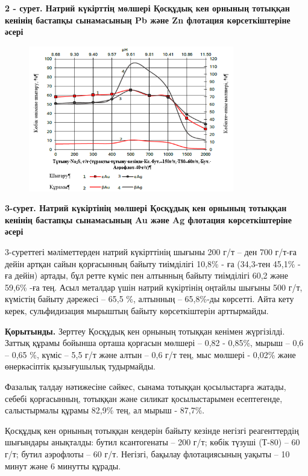 {{\bfseries 2 - сурет. Натрий күкірттің мөлшері Қосқұдық кен орнының
тотыққан кенінің бастапқы сынамасының Pb және Zn флотация
көрсеткіштеріне әсері}

\begin{figure}[H]
	\centering
	\includegraphics[width=0.8\textwidth]{media/gorn/image8}
	\caption*{}
\end{figure}


{\bfseries 3-сурет. Натрий күкіртінің мөлшері Қосқұдық кен орнының тотыққан
кенінің бастапқы сынамасының Au және Ag флотация көрсеткіштеріне әсері}

3-суреттегі мәліметтерден натрий күкірттінің шығыны 200 г/т -- ден 700
г/т-ға дейін артқан сайын қорғасынның байыту тиімділігі 10,8\% - ға
(34,3-тен 45,1\% - ға дейін) артады, бұл ретте күміс пен алтынның байыту
тиімділігі 60,2 және 59,6\% -ға тең. Асыл металдар үшін натрий
күкіртінің оңтайлы шығыны 500 г/т, күмістің байыту дәрежесі -- 65,5 \%,
алтынның -- 65,8\%-ды көрсетті. Айта кету керек, сульфидизация мырыштың
байыту көрсеткіштерін арттырмайды.

{\bfseries Қорытынды.} Зерттеу Қосқұдық кен орнының тотыққан кенімен
жүргізілді. Заттық құрамы бойынша орташа қорғасын мөлшері -- 0,82 -
0,85\%, мырыш -- 0,6 -- 0,65 \%, күміс -- 5,5 г/т және алтын -- 0,6 г/т
тең, мыс мөлшері - 0,02\% және өнеркәсіптік қызығушылық тудырмайды.

Фазалық талдау нәтижесіне сәйкес, сынама тотыққан қосылыстарға жатады,
себебі қорғасынның, тотыққан және силикат қосылыстарымен есептегенде,
салыстырмалы құрамы 82,9\% тең, ал мырыш - 87,7\%.

Қосқұдық кен орнының тотыққан кендерін байыту кезінде негізгі
реагенттердің шығындары анықталды: бутил ксантогенаты -- 200 г/т; көбік
түзуші (Т-80) -- 60 г/т; бутил аэрофлоты -- 60 г/т. Негізгі, бақылау
флотациясының уақыты -- 10 минут және 6 минутты құрады.

}
